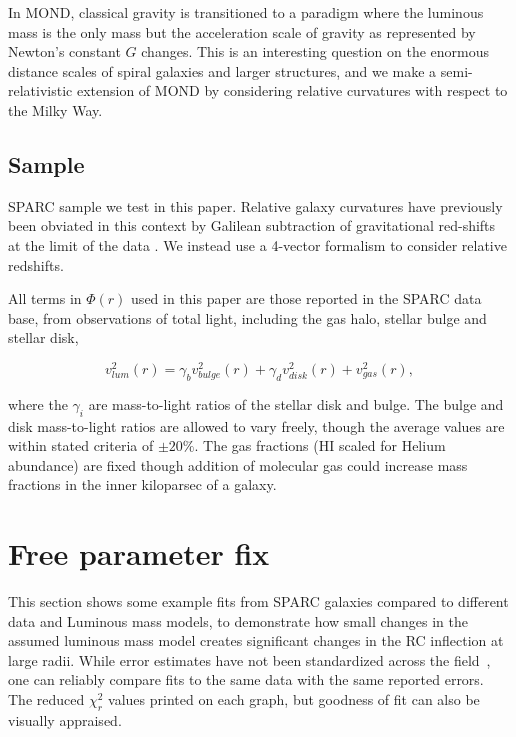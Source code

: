 \documentclass[reprint,%
 amsmath,amssymb,
 aps,
]{revtex4-1}
\begin{document}
 In MOND,  classical gravity is transitioned to  a paradigm where the luminous mass is the only mass  but    the acceleration scale of gravity as represented by  Newton's  constant $G$ changes. This is an  interesting    question   on the enormous distance scales of spiral galaxies and larger structures, and we make a semi-relativistic extension of MOND 
 by considering relative curvatures with respect to the Milky Way. 
 \subsection{Sample}
 SPARC sample we test in this paper.   Relative galaxy curvatures have previously been   obviated in this context by Galilean subtraction of   gravitational red-shifts at the    limit of the data  \citep{MTW}. We instead use a 4-vector formalism to consider relative redshifts.  

 

 All terms in $\Phi(r)$ used in this paper  are   those reported in   the SPARC data base, from observations of total light, including the gas halo, stellar bulge and  stellar disk, 
 
  \begin{equation}
v_{lum}^2 (r)= \gamma_b v_{bulge}^2(r) +  \gamma_d v_{disk}^2(r) + v_{gas}^2(r),  
\label{eq:zonte3}
\end{equation} 
 
where the  $\gamma_i$  are  mass-to-light ratios of the stellar disk and bulge.   The    bulge and disk mass-to-light ratios are allowed to vary freely, though the average values are within stated criteria   \cite{2016Lelli} of $\pm 20\%$. The gas fractions (HI scaled for Helium abundance) are fixed though addition of molecular gas could increase mass fractions in the inner kiloparsec of a galaxy. 



 

 
\section{Free parameter fix }
 


This section shows some example fits from SPARC galaxies compared to different data and  Luminous mass models, to demonstrate how small changes in the   assumed  luminous mass model creates significant changes in the RC inflection at large radii. 
While error    estimates have not been standardized across the field~\citep{Blok,Gent,Toky},     one can reliably   compare fits to the same data with the same reported errors. The     reduced $\chi^2_r$ values printed on each graph, but goodness of fit can also be visually appraised.  
 
\end{document}
